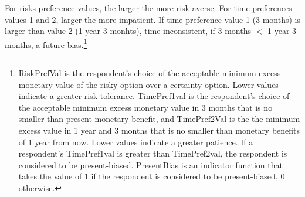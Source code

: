 For risks preference values, the larger the more risk averse. For time preferences values 1 and 2, larger the more impatient. If time preference value 1 (3 months) is larger than value 2 (1 year 3 monhts), time inconsistent, if 3 months $<$ 1 year 3 months, a future bias.\footnote{\textsf{RiskPrefVal} is the respondent's choice of the acceptable minimum excess monetary value of the risky option over a certainty option. Lower values indicate a greater risk tolerance. \textsf{TimePref1val} is the respondent's choice of the acceptable minimum excess monetary value in 3 months that is no smaller than present monetary benefit, and \textsf{TimePref2Val} is the the minimum excess value in 1 year and 3 months that is no smaller than monetary benefits of 1 year from now. Lower values indicate a greater patience. If a respondent's \textsf{TimePref1val} is greater than \textsf{TimePref2val}, the respondent is considered to be present-biased. \textsf{PresentBias} is an indicator function that takes the value of 1 if the respondent is considered to be present-biased, 0 otherwise. }




